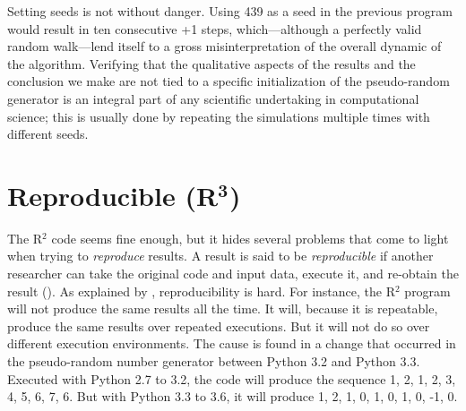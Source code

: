 \documentclass[a4paper,11pt]{article}
\begin{document}
Setting seeds is not without danger. 
Using 439 as a seed in the previous program would result in ten consecutive +1 steps, which---although a perfectly valid random walk---lend itself to a gross misinterpretation of the overall dynamic of the algorithm. 
Verifying that the qualitative aspects of the results and the conclusion we make are not tied to a specific initialization of the pseudo-random generator is an integral part of any scientific undertaking in computational science; 
this is usually done by repeating the simulations multiple times with different seeds.  




\section*{Reproducible (R$^{\mathbf 3}$)}

The R$^2$ code seems fine enough, but it hides several problems that come to light when trying to {\em reproduce} results.
A result is said to be \emph{reproducible} if another researcher can take the original code and input data, execute it, and re-obtain the result (\cite{Peng:2006}). 
As explained by \citeauthor{Mesnard:2016} \citep{Mesnard:2016}, reproducibility is hard. 
For instance, the R$^2$ program will not produce the same results all the time. It will, because it is repeatable, produce the same results over repeated executions.
But it will not do so over different execution environments. The cause is found in a change that occurred in the pseudo-random number generator between Python 3.2 and Python 3.3. 
Executed with Python 2.7 to 3.2, the code will produce the sequence 1, 2, 1, 2, 3, 4, 5, 6, 7, 6. But with Python 3.3 to 3.6, it will produce 1, 2, 1, 0, 1, 0, 1, 0, -1, 0.\\
\end{document}
